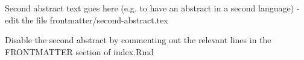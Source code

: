 Second abstract text goes here (e.g. to have an abstract in a second language) - edit the file frontmatter/second-abstract.tex

Disable the second abstract by commenting out the relevant lines in the FRONTMATTER section of index.Rmd